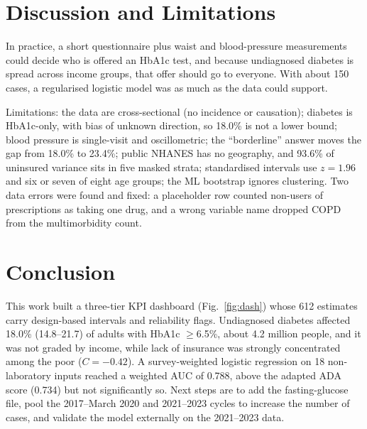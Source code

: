 \section{Discussion and Limitations}
In practice, a short questionnaire plus waist and blood-pressure measurements could decide who is offered an HbA1c test, and because undiagnosed diabetes is spread across income groups, that offer should go to everyone. With about 150 cases, a regularised logistic model was as much as the data could support.

Limitations: the data are cross-sectional (no incidence or causation); diabetes is HbA1c-only, with bias of unknown direction, so 18.0\% is not a lower bound; blood pressure is single-visit and oscillometric; the ``borderline'' answer moves the gap from 18.0\% to 23.4\%; public NHANES has no geography, and 93.6\% of uninsured variance sits in five masked strata; standardised intervals use $z=1.96$ and six or seven of eight age groups; the ML bootstrap ignores clustering. Two data errors were found and fixed: a placeholder row counted non-users of prescriptions as taking one drug, and a wrong variable name dropped COPD from the multimorbidity count.

\section{Conclusion}
This work built a three-tier KPI dashboard (Fig.~\ref{fig:dash}) whose 612 estimates carry design-based intervals and reliability flags. Undiagnosed diabetes affected 18.0\% (14.8--21.7) of adults with HbA1c $\geq$6.5\%, about 4.2 million people, and it was not graded by income, while lack of insurance was strongly concentrated among the poor ($C=-0.42$). A survey-weighted logistic regression on 18 non-laboratory inputs reached a weighted AUC of 0.788, above the adapted ADA score (0.734) but not significantly so. Next steps are to add the fasting-glucose file, pool the 2017--March 2020 and 2021--2023 cycles to increase the number of cases, and validate the model externally on the 2021--2023 data.
